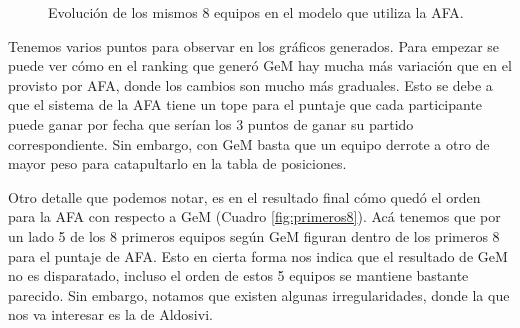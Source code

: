 \begin{figure}[H]
	\centering
	\caption{Evolución de los mismos 8 equipos en el modelo que utiliza la AFA.}
	\label{fig:afa_evo}
\end{figure}

Tenemos varios puntos para observar en los gráficos generados. Para empezar se
puede ver cómo en el ranking que generó GeM hay mucha más variación que en el
provisto por AFA, donde los cambios son mucho más graduales. Esto se debe a que
el sistema de la AFA tiene un tope para el puntaje que cada participante puede
ganar por fecha que serían los 3 puntos de ganar su partido correspondiente. Sin
embargo, con GeM basta que un equipo derrote a otro de mayor peso para
catapultarlo en la tabla de posiciones.

Otro detalle que podemos notar, es en el resultado final cómo quedó el orden
para la AFA con respecto a GeM (Cuadro \ref{fig:primeros8}). Acá tenemos que por
un lado 5 de los 8 primeros equipos según GeM figuran dentro de los primeros 8
para el puntaje de AFA. Esto en cierta forma nos indica que el resultado de GeM
no es disparatado, incluso el orden de estos 5 equipos se mantiene bastante
parecido. Sin embargo, notamos que existen algunas irregularidades, donde la que
nos va interesar es la de Aldosivi.


